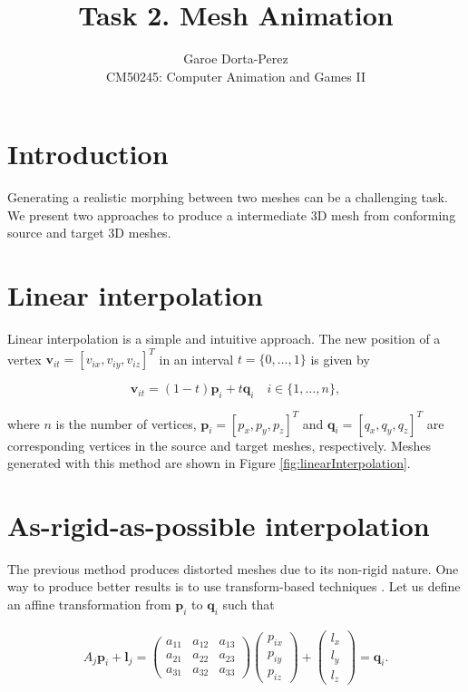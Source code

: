 \documentclass[12pt]{article}
\begin{document}
  
\title{Task 2. Mesh Animation}
\author{Garoe Dorta-Perez\\
CM50245: Computer Animation and Games II}
 
\maketitle
 
\section{Introduction}

Generating a realistic morphing between two meshes can be a challenging task.
We present two approaches to produce a intermediate 3D mesh from conforming source and target 3D meshes. 

\section{Linear interpolation}

Linear interpolation is a simple and intuitive approach.
The new position of a vertex $\mathbf{v}_{it} = \left[ v_{ix}, v_{iy}, v_{iz}\right]^T $ in an interval $t = \lbrace 0, \ldots, 1 \rbrace$ is given by

\begin{equation*}
\mathbf{v}_{it} = (1 - t) \mathbf{p}_i + t \mathbf{q}_i \quad i \in \lbrace 1, \ldots, n \rbrace,
\end{equation*}

where $n$ is the number of vertices, $\mathbf{p}_i = \left[ p_x, p_y, p_z\right]^T$ and $\mathbf{q}_i = \left[ q_x, q_y, q_z\right]^T$ are corresponding vertices in the source and target meshes, respectively.
Meshes generated with this method are shown in Figure \ref{fig:linearInterpolation}.

\section{As-rigid-as-possible interpolation}

The previous method produces distorted meshes due to its non-rigid nature.
One way to produce better results is to use transform-based techniques \cite{Alexa2000}.
Let us define an affine transformation from $\mathbf{p}_i$ to $\mathbf{q}_i$ such that

\begin{align*}
A_j \mathbf{p}_i + \mathbf{l}_j = \begin{pmatrix}
 a_{11} & a_{12} & a_{13} \\ 
 a_{21} & a_{22} & a_{23} \\ 
 a_{31} & a_{32}  & a_{33} 
\end{pmatrix} 
\begin{pmatrix}
 p_{ix} \\ 
 p_{iy} \\ 
 p_{iz} 
\end{pmatrix} +
\begin{pmatrix}
 l_x \\ 
 l_y \\ 
 l_z
\end{pmatrix} = \mathbf{q}_i.
\end{align*}
\end{document}
